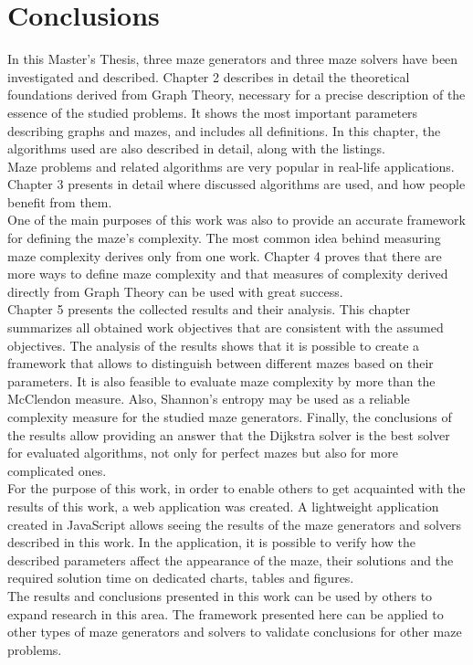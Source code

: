 \chapter{Conclusions}\label{cha:Conclusions}
In this Master's Thesis, three maze generators and three maze solvers have been investigated and described. Chapter 2 describes in detail the theoretical foundations derived from Graph Theory,
necessary for a precise description of the essence of the studied problems. It shows the most important parameters describing graphs and mazes, and includes all definitions. In this chapter, the algorithms
used are also described in detail, along with the listings.\\
\indent Maze problems and related algorithms are very popular in real-life applications. Chapter 3 presents in detail where discussed algorithms are used, and how people benefit from them.\\ 
One of the main purposes of this work was also to provide an accurate framework for defining the maze's complexity. The most common idea behind measuring maze complexity derives only from one work. Chapter 4
proves that there are more ways to define maze complexity and that measures of complexity derived directly from Graph Theory can be used with great success.\\
\indent Chapter 5 presents the collected results and their analysis. This chapter summarizes all obtained work objectives that are consistent with the assumed objectives. The analysis of the results shows that it is possible to create a framework that allows to distinguish between different mazes based on their parameters. It is also feasible to evaluate maze complexity by more than the McClendon measure. Also, Shannon's entropy may be used as a reliable complexity measure for the studied maze generators. 
Finally, the conclusions of the results allow providing an answer that the Dijkstra solver is the best solver for evaluated algorithms, not only for perfect mazes but also for more complicated ones.\\
\indent For the purpose of this work, in order to enable others to get acquainted with the results of this work, a web application was created.  A lightweight application created in JavaScript allows seeing the results of the maze generators and solvers described in this work. In the application, it is possible to verify how the described parameters affect the appearance of the maze, their solutions and the required solution time on dedicated charts, tables and figures.\\
\indent The results and conclusions presented in this work can be used by others to expand research in this area. The framework presented here can be applied to other types of maze generators and solvers to validate conclusions for other maze problems.

